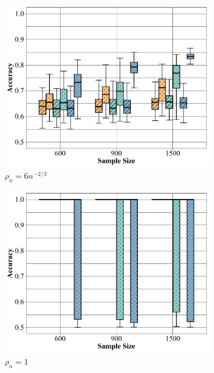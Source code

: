 \documentclass[10pt,journal,compsoc]{IEEEtran}
\numberwithin{equation}{section}
\begin{document}
\begin{figure}[htbp]
\begin{subfigure}{.6\columnwidth}
\includegraphics[width=\columnwidth]{boxplot/nb_23.pdf}%
\caption{$\rho_n = 6n^{-2/3}$}
\end{subfigure}
\par
\centering
\begin{subfigure}{.6\columnwidth}
\includegraphics[width=\columnwidth]{boxplot/b_d.pdf}%
\caption{$\rho_n = 1$}
\label{dense:2}
\end{subfigure}
\begin{subfigure}{.6\columnwidth}

\end{subfigure}
\end{figure}
\end{document}
